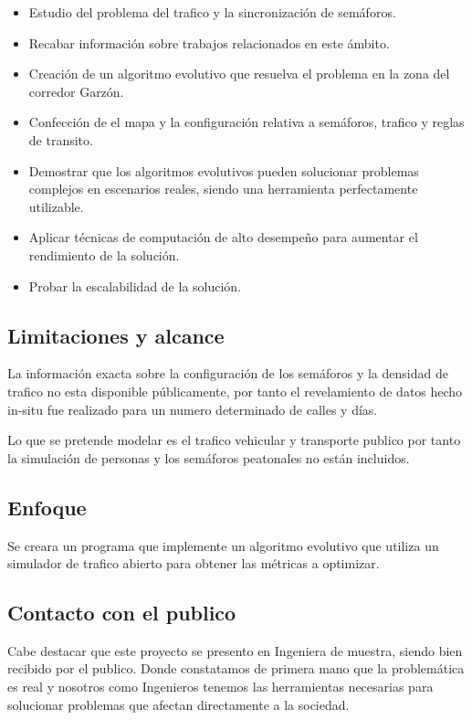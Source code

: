\begin{itemize}
	\item Estudio del problema del trafico y la sincronización de semáforos.
	\item Recabar información sobre trabajos relacionados en este ámbito.
	\item Creación de un algoritmo evolutivo que resuelva el problema en la zona del corredor Garzón.
	\item Confección de el mapa y la configuración relativa a semáforos, trafico y reglas de transito.	
	\item Demostrar que los algoritmos evolutivos pueden solucionar problemas complejos en escenarios  reales, siendo una herramienta perfectamente utilizable.
	\item Aplicar técnicas de computación de alto desempeño para aumentar el rendimiento de la solución.
	\item Probar la escalabilidad de la solución.
\end{itemize}

\subsection{Limitaciones y alcance}
La información exacta sobre la configuración de los semáforos y la densidad de trafico no esta disponible públicamente, por tanto el revelamiento de datos hecho in-situ fue realizado para un numero determinado de calles y días.

Lo que se pretende modelar es el trafico vehicular y transporte publico por tanto la simulación de personas y los semáforos peatonales no están incluidos.

 
\subsection{Enfoque}
Se creara un programa que implemente un algoritmo evolutivo  que utiliza un simulador de trafico abierto para obtener las métricas a optimizar.


\subsection{Contacto con el publico}
Cabe destacar que este proyecto se presento en Ingeniera de muestra, siendo bien recibido por el publico. Donde constatamos de primera mano que la problemática es real y nosotros como Ingenieros tenemos las herramientas necesarias para solucionar problemas que afectan directamente a la sociedad.

